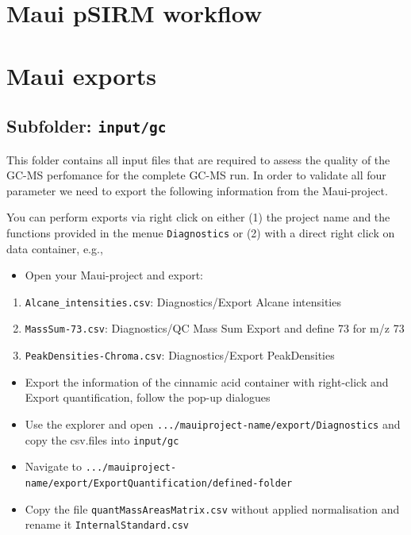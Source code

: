 \documentclass[]{book}
\providecommand{\tightlist}{%
  \setlength{\itemsep}{0pt}\setlength{\parskip}{0pt}}
\theoremstyle{definition}
\theoremstyle{definition}
\theoremstyle{definition}
\theoremstyle{remark}
\begin{document}
\section{Maui pSIRM workflow}\label{mauipsirm}

\section{Maui exports}\label{mauiexport}

\subsection{\texorpdfstring{Subfolder:
\texttt{input/gc}}{Subfolder: input/gc}}\label{subfolder-inputgc}

This folder contains all input files that are required to assess the
quality of the GC-MS perfomance for the complete GC-MS run. In order to
validate all four parameter we need to export the following information
from the Maui-project.

You can perform exports via right click on either (1) the project name
and the functions provided in the menue \texttt{Diagnostics} or (2) with
a direct right click on data container, e.g.,

\begin{itemize}
\tightlist
\item
  Open your Maui-project and export:
\end{itemize}

\begin{enumerate}
\def\labelenumi{\arabic{enumi}.}
\tightlist
\item
  \texttt{Alcane\_intensities.csv}: Diagnostics/Export Alcane
  intensities
\item
  \texttt{MassSum-73.csv}: Diagnostics/QC Mass Sum Export and define 73
  for m/z 73
\item
  \texttt{PeakDensities-Chroma.csv}: Diagnostics/Export PeakDensities
\end{enumerate}

\begin{itemize}
\tightlist
\item
  Export the information of the cinnamic acid container with right-click
  and Export quantification, follow the pop-up dialogues
\item
  Use the explorer and open
  \texttt{.../mauiproject-name/export/Diagnostics} and copy the
  csv.files into \texttt{input/gc}
\item
  Navigate to
  \texttt{.../mauiproject-name/export/ExportQuantification/defined-folder}
\item
  Copy the file \texttt{quantMassAreasMatrix.csv} without applied
  normalisation and rename it \texttt{InternalStandard.csv}
\end{itemize}
\end{document}
